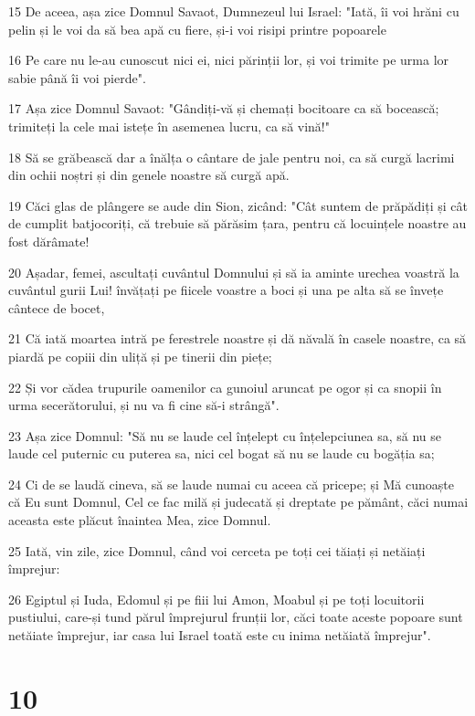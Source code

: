 \par 15 De aceea, așa zice Domnul Savaot, Dumnezeul lui Israel: "Iată, îi voi hrăni cu pelin și le voi da să bea apă cu fiere, și-i voi risipi printre popoarele
\par 16 Pe care nu le-au cunoscut nici ei, nici părinții lor, și voi trimite pe urma lor sabie până îi voi pierde".
\par 17 Așa zice Domnul Savaot: "Gândiți-vă și chemați bocitoare ca să bocească; trimiteți la cele mai istețe în asemenea lucru, ca să vină!"
\par 18 Să se grăbească dar a înălța o cântare de jale pentru noi, ca să curgă lacrimi din ochii noștri și din genele noastre să curgă apă.
\par 19 Căci glas de plângere se aude din Sion, zicând: "Cât suntem de prăpădiți și cât de cumplit batjocoriți, că trebuie să părăsim țara, pentru că locuințele noastre au fost dărâmate!
\par 20 Așadar, femei, ascultați cuvântul Domnului și să ia aminte urechea voastră la cuvântul gurii Lui! învățați pe fiicele voastre a boci și una pe alta să se învețe cântece de bocet,
\par 21 Că iată moartea intră pe ferestrele noastre și dă năvală în casele noastre, ca să piardă pe copiii din uliță și pe tinerii din piețe;
\par 22 Și vor cădea trupurile oamenilor ca gunoiul aruncat pe ogor și ca snopii în urma secerătorului, și nu va fi cine să-i strângă".
\par 23 Așa zice Domnul: "Să nu se laude cel înțelept cu înțelepciunea sa, să nu se laude cel puternic cu puterea sa, nici cel bogat să nu se laude cu bogăția sa;
\par 24 Ci de se laudă cineva, să se laude numai cu aceea că pricepe; și Mă cunoaște că Eu sunt Domnul, Cel ce fac milă și judecată și dreptate pe pământ, căci numai aceasta este plăcut înaintea Mea, zice Domnul.
\par 25 Iată, vin zile, zice Domnul, când voi cerceta pe toți cei tăiați și netăiați împrejur:
\par 26 Egiptul și Iuda, Edomul și pe fiii lui Amon, Moabul și pe toți locuitorii pustiului, care-și tund părul împrejurul frunții lor, căci toate aceste popoare sunt netăiate împrejur, iar casa lui Israel toată este cu inima netăiată împrejur".

\chapter{10}

